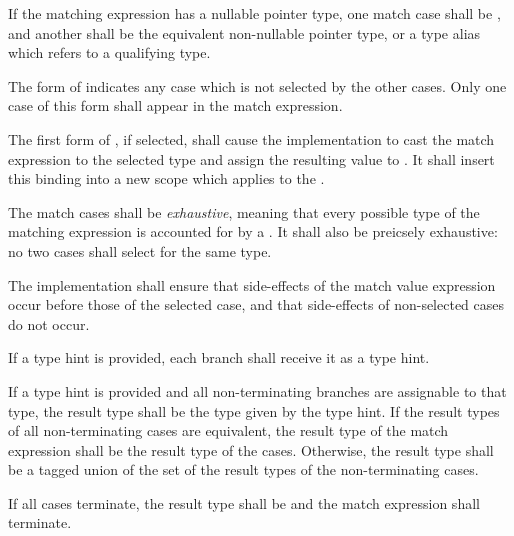 \specsubsubitem
If the matching expression has a nullable pointer type, one match case shall be
, and another shall be the equivalent non-nullable pointer type,
or a type alias which refers to a qualifying type.

\specsubsubitem
The \terminal{*} form of  indicates any case which is
not selected by the other cases. Only one case of this form shall appear in the
match expression.

\specsubsubitem
The first form of , if selected, shall cause the
implementation to cast the match expression to the selected type and assign the
resulting value to . It shall insert this binding into a new
scope which applies to the .

\specsubsubitem
The match cases shall be \textit{exhaustive}, meaning that every possible type
of the matching expression is accounted for by a . It
shall also be preicsely exhaustive: no two cases shall select for the same
type.

\specsubsubitem
The implementation shall ensure that side-effects of the match value
expression occur before those of the selected case, and that side-effects of
non-selected cases do not occur.

\specsubsubitem
If a type hint is provided, each branch shall receive it as a type hint.

\specsubsubitem
If a type hint is provided and all non-terminating branches are assignable to
that type, the result type shall be the type given by the type hint. If the
result types of all non-terminating cases are equivalent, the result type of
the match expression shall be the result type of the cases. Otherwise, the
result type shall be a tagged union of the set of the result types of the
non-terminating cases.

If all cases terminate, the result type shall be  and the match
expression shall terminate.


\begin{grammar}
 \\
	   \\
	\terminal{*}    \\
	 \terminal{=}  \\

 \oneof \\
	\terminal{=}
	\terminal{+=}
	\terminal{-=}
	\terminal{*=}
	\terminal{/=}
	\terminal{\%=}
	\terminal{\textless{}\textless{}=}
	\terminal{\textgreater{}\textgreater{}=}
	\terminal{\&=}
	\terminal{|=}
	\terminal{\textasciicircum=}
	\terminal{\&\&=}
	\terminal{||=}
	\terminal{\textasciicircum\textasciicircum=}
\end{grammar}

